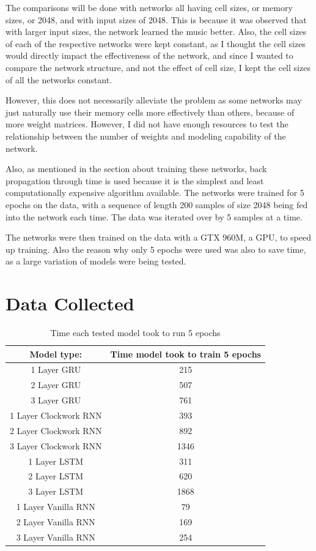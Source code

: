 \documentclass[12pt, titlepage]{article}
\begin{document}
The comparisons will be done with networks all having cell sizes, or memory
sizes, or 2048, and with input sizes of 2048. This is because it was observed
that with larger input sizes, the network learned the music better. Also, the
cell sizes of each of the respective networks were kept constant, as I thought
the cell sizes would directly impact the effectiveness of the network, and since
I wanted to compare the network structure, and not the effect of cell size, I
kept the cell sizes of all the networks constant.

However, this does not necessarily alleviate the problem as some networks may
just naturally use their memory cells more effectively than others, because of
more weight matrices. However, I did not have enough resources to test the
relationship between the number of weights and modeling capability of the
network.

Also, as mentioned in the section about training these networks, back
propagation through time is used because it is the simplest and least
computationally expensive algorithm available. The networks were trained for 5
epochs on the data, with a sequence of length 200 samples of size 2048 being fed
into the network each time. The data was iterated over by 5 samples at a time.

The networks were then trained on the data with a GTX 960M, a GPU, to speed up
training. Also the reason why only 5 epochs were used was also to save time, as
a large variation of models were being tested.

\section{Data Collected}
\begin{table}[H]
	\begin{tabular}{c|c}
		Model type: & Time model took to train 5 epochs \\\hline
		1 Layer GRU& 215 \\
		2 Layer GRU& 507\\
		3 Layer GRU& 761\\
		1 Layer Clockwork RNN& 393\\
		2 Layer Clockwork RNN& 892\\
		3 Layer Clockwork RNN& 1346\\
		1 Layer LSTM& 311\\
		2 Layer LSTM& 620\\
		3 Layer LSTM& 1868\\
		1 Layer Vanilla RNN& 79\\
		2 Layer Vanilla RNN& 169\\
		3 Layer Vanilla RNN& 254\\
	\end{tabular}
	\caption{Time each tested model took to run 5 epochs}
\end{table}
\end{document}

